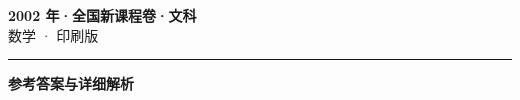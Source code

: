 \documentclass[zihao=5, a4paper]{ctexart}
\begin{document}
\begin{center}
  {\Large\bfseries 2002 年·全国新课程卷·文科}\\[4pt]
  {\large 数学 · 印刷版}
\end{center}
\medskip
{}

\par\bigskip\hrule\bigskip
{}
\begin{center}{\large\bfseries 参考答案与详细解析}\end{center}
\smallskip

\end{document}
